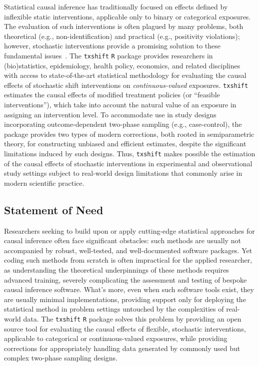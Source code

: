 Statistical causal inference has traditionally focused on effects defined by
inflexible static interventions, applicable only to binary or categorical
exposures. The evaluation of such interventions is often plagued by many
problems, both theoretical (e.g., non-identification) and practical (e.g.,
positivity violations); however, stochastic interventions provide a promising
solution to these fundamental issues~\citep{diaz2018stochastic}. The
\texttt{txshift} \texttt{R} package provides researchers in (bio)statistics,
epidemiology, health policy, economics, and related disciplines with access to
state-of-the-art statistical methodology for evaluating the causal effects of
stochastic shift interventions on \textit{continuous-valued} exposures.
\texttt{txshift} estimates the causal effects of modified treatment policies (or
``feasible interventions''), which take into account the natural value of an
exposure in assigning an intervention level. To accommodate use in study designs
incorporating outcome-dependent two-phase sampling (e.g., case-control), the
package provides two types of modern corrections, both rooted in semiparametric
theory, for constructing unbiased and efficient estimates, despite the
significant limitations induced by such designs. Thus, \texttt{txshift} makes
possible the estimation of the causal effects of stochastic interventions in
experimental and observational study settings subject to real-world design
limitations that commonly arise in modern scientific practice.

\subsection{Statement of Need}

Researchers seeking to build upon or apply cutting-edge statistical approaches
for causal inference often face significant obstacles: such methods are usually
not accompanied by robust, well-tested, and well-documented software packages.
Yet coding such methods from scratch is often impractical for the applied
researcher, as understanding the theoretical underpinnings of these methods
requires advanced training, severely complicating the assessment and testing of
bespoke causal inference software. What's more, even when such software tools
exist, they are usually minimal implementations, providing support only for
deploying the statistical method in problem settings untouched by the
complexities of real-world data. The \texttt{txshift} \texttt{R} package solves
this problem by providing an open source tool for evaluating the causal effects
of flexible, stochastic interventions, applicable to categorical or
continuous-valued exposures, while providing corrections for appropriately
handling data generated by commonly used but complex two-phase sampling designs.

